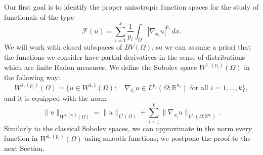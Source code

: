 \documentclass[reqno,12pt]{amsart}
\def\R{\mathbb R}
\numberwithin{equation}{section}
\begin{document}
Our first goal is to identify the proper anisotropic function spaces for the study of functionals of the type
\begin{equation}
\mathcal{F}(u) = \sum_{i = 1}^k \frac{1}{p_i} \int_\Omega |\nabla_{x_i} u|^{p_i} \, dx.
\end{equation}
We will work with closed subspaces of $BV(\Omega)$, so we can assume a priori that the functions we consider have partial derivatives in the sense of distributions which are finite Radon measures. We define the Sobolev space $W^{1,(p_i)}(\Omega)$ in the following way: 
\begin{equation}
W^{1,(p_i)}(\Omega) = \bigg\{ u \in W^{1,1}(\Omega): \quad \nabla_{x_i} u \in L^{p_i}(\Omega; \R^{n_i}) \mbox{ for all } i = 1,...,k \bigg\},
\end{equation}
and it is equipped with the norm
\begin{equation}
\| u \|_{W^{1,(p_i)}(\Omega)} = \| u \|_{L^1(\Omega)} + \sum_{i=1}^k \| \nabla_{x_i} u \|_{L^{p_i}(\Omega; \R^{n_i})}.
\end{equation}
Similarly to the classical Sobolev spaces, we can approximate in the norm every function in $W^{1,(p_i)}(\Omega)$ using smooth functions; we postpone the proof to the next Section.
\end{document}
